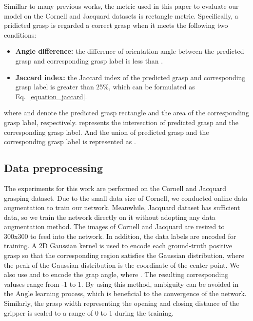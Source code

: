 \documentclass[journal]{IEEEtran}
\begin{document}
Simillar to many previous works, the metric used in this paper to evaluate our model on the Cornell and Jacquard datasets is rectangle metric. Specifically, a pridicted grasp is regarded a correct grasp when it meets the following two conditions:

\begin{itemize}
	
	\item \textbf{Angle difference:} the difference of orientation angle between the predicted grasp and corresponding grasp label is less than  .
	
	\item \textbf{Jaccard index:}  the Jaccard index of the predicted grasp and corresponding grasp label is greater than 25\%, which can be formulated as Eq.~\ref{equation_jaccard}.
	
	\begin{small}
		
	\end{small}
		
\end{itemize}

where  and  denote the predicted grasp rectangle and the area of the corresponding grasp label, respectively.  represents the intersection of predicted grasp and the corresponding grasp label. And the union of predicted grasp and the corresponding grasp label is represented as .
	
\subsection{Data preprocessing}
The experiments for this work are performed on the Cornell and Jacquard grasping dataset. Due to the small data size of Cornell, we conducted online data augmentation to train our network. Meanwhile, Jacquard dataset has sufficient data, so we train the network directly on it without adopting any data augmentation method. The images of Cornell and Jacquard are resized to 300x300 to feed into the network. In addition, the data labels are encoded for training. A 2D Gaussian kernel is used to encode each ground-truth positive grasp so that the corresponding region satisfies the Gaussian distribution, where the peak of the Gaussian distribution is the coordinate of the center point. We also use  and  to encode the grap angle, where . The resulting corresponding valuses range from -1 to 1. By using this method, ambiguity can be avoided in the Angle learning process, which is beneficial to the convergence of the network. Similarly, the grasp width representing the opening and closing distance of the gripper is scaled to a range of 0 to 1 during the training.
\end{document}
